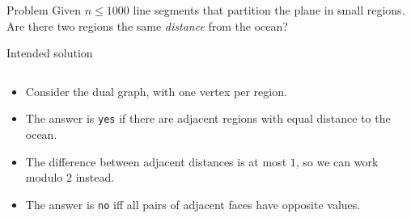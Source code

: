 \begin{frame}
    \frametitle{\problemtitle}
    \begin{block}{Problem}
      Given $n\leq 1000$ line segments that partition the plane in small
      regions.
      Are there two regions the same \emph{distance} from the ocean?
    \end{block}
    \begin{block}{Intended solution}
      \begin{columns}
      \begin{column}{0.5\textwidth}
      \begin{itemize}
        \item<+-> Consider the dual graph, with one vertex per region.
        \item<+-> The answer is \texttt{yes} if there are adjacent regions with equal distance to the ocean.
        \item<+-> The difference between adjacent distances is at most $1$, so we can work modulo $2$ instead.
        \item<+-> The answer is \texttt{no} iff all pairs of adjacent faces have
          opposite values.
      \end{itemize}
      \end{column}
      \begin{column}{0.42\textwidth}
      \begin{center}

\end{center}
\end{column}
\end{columns}
\end{block}
\end{frame}

